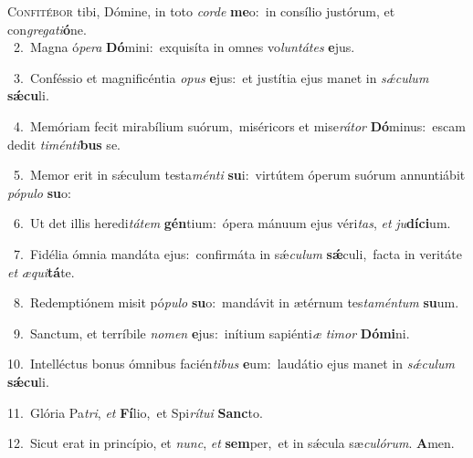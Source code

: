 \lettrine{\initial\textcolor{\initialcolor}{C}}{onfitébor} tibi, Dómine, in toto \textit{cor}\-\textit{de} \textbf{me}\-o:~\star in consílio justórum, et con\-\textit{gre}\-\textit{ga}\textit{ti}\textbf{ó}ne.\\
{\numbfont\textcolor{\numbcolor}{~2.}}~Magna ó\-\textit{pe}\-\textit{ra} \textbf{Dó}\-mini:~\star exquisíta in omnes vo\-\textit{lun}\-\textit{tá}\textit{tes} \textbf{e}\-jus.\par
{\numbfont\textcolor{\numbcolor}{~3.}}~Conféssio et magnificéntia \textit{o}\-\textit{pus} \textbf{e}\-jus:~\star et justítia ejus manet in \textit{sǽ}\-\textit{cu}\textit{lum} \textbf{sǽ}\-\textbf{cu}li.\par
{\numbfont\textcolor{\numbcolor}{~4.}}~Memóriam fecit mirabílium suórum,~\dagger miséricors et mise\-\textit{rá}\-\textit{tor} \textbf{Dó}\-minus:~\star escam dedit \textit{ti}\-\textit{mén}\textit{ti}\textbf{bus} se.\par
{\numbfont\textcolor{\numbcolor}{~5.}}~Memor erit in sǽculum testa\-\textit{mén}\-\textit{ti} \textbf{su}\-i:~\star virtútem óperum suórum annuntiábit \textit{pó}\-\textit{pu}\textit{lo} \textbf{su}\-o:\par
{\numbfont\textcolor{\numbcolor}{~6.}}~Ut det illis heredi\-\textit{tá}\-\textit{tem} \textbf{gén}\-tium:~\star ópera mánuum ejus véri\-\textit{tas}\-, \textit{et} \textit{ju}\-\textbf{dí}\textbf{ci}um.\par
{\numbfont\textcolor{\numbcolor}{~7.}}~Fidélia ómnia mandáta ejus:~\dagger confirmáta in sǽ\-\textit{cu}\-\textit{lum} \textbf{sǽ}\-culi,~\star facta in veritáte \textit{et} \textit{æ}\-\textit{qui}\textbf{tá}te.\par
{\numbfont\textcolor{\numbcolor}{~8.}}~Redemptiónem misit pó\-\textit{pu}\-\textit{lo} \textbf{su}\-o:~\star mandávit in ætérnum tes\-\textit{ta}\-\textit{mén}\textit{tum} \textbf{su}\-um.\par
{\numbfont\textcolor{\numbcolor}{~9.}}~Sanctum, et terríbile \textit{no}\-\textit{men} \textbf{e}\-jus:~\star inítium sapiénti\textit{æ} \textit{ti}\-\textit{mor} \textbf{Dó}\-\textbf{mi}ni.\par
{\numbfont\textcolor{\numbcolor}{10.}}~Intelléctus bonus ómnibus facién\-\textit{ti}\-\textit{bus} \textbf{e}\-um:~\star laudátio ejus manet in \textit{sǽ}\-\textit{cu}\textit{lum} \textbf{sǽ}\-\textbf{cu}li.\par
{\numbfont\textcolor{\numbcolor}{11.}}~Glória Pa\-\textit{tri}\-, \textit{et} \textbf{Fí}\-lio,~\star et Spi\-\textit{rí}\-\textit{tu}\textit{i} \textbf{Sanc}\-to.\par
{\numbfont\textcolor{\numbcolor}{12.}}~Sicut erat in princípio, et \textit{nunc}\-, \textit{et} \textbf{sem}\-per,~\star et in sǽcula sæ\-\textit{cu}\-\textit{ló}\textit{rum}. \textbf{A}\-men.\par
